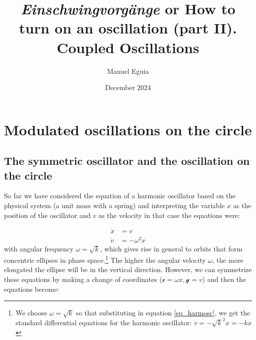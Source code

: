 \documentclass{article}
\title{{\em Einschwingvorgänge} or How to turn on an oscillation (part II). \\ Coupled Oscillations}
\author{Manuel Eguia}
\date{December 2024}
\begin{document}
\maketitle

\section{Modulated oscillations on the circle}

\subsection{The symmetric oscillator and the oscillation on the circle}
So far we have considered the equation of a harmonic oscillator based on the physical system (a unit mass with a spring) and interpreting the variable $x$ as the position of the oscillator and $v$ as the velocity in that case the equations were:

\begin{subequations} \label{eq_harmosc}
\begin{align}
    \dot{x} & = v \\
    \dot{v} & = -\omega^2x 
\end{align}
\end{subequations}
with angular frequency $\omega=\sqrt{k}$, which gives rise in general to orbits that form concentric ellipses in phase space.\footnote{We choose $\omega=\sqrt{k}$ so that substituting in equation \ref{eq_harmosc}, we get the standard differential equations for the harmonic oscillator: $\dot{v} = -\sqrt{k}^2x = -kx$} The higher the angular velocity $\omega$, the more elongated the ellipse will be in the vertical direction. 
However, we can symmetrize these equations by making a change of coordinates ($\mathscr{x} = \omega x , \mathscr{y} = v$) and then the equations become:
\end{document}
